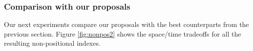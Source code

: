 \documentclass[review]{elsarticle}
\newcommand{\simplen}{\texttt{Simple9}}
\newcommand{\efopt}{\texttt{EF-opt}}
\newcommand{\optpfd}{\texttt{OPT-PFD}}
\begin{document}
%
% 

\subsubsection{Comparison with our proposals} \label{exp:nopos:ours}

Our next experiments compare our proposals with the best counterparts from the previous section. Figure \ref{fig:nonpos2} shows the space/time tradeoffs for all the resulting non-positional indexes. 

\end{document}
